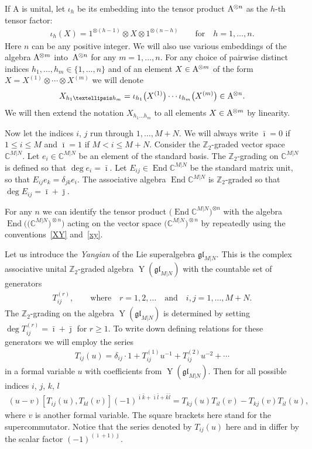 \documentclass[11pt]{article}
\numberwithin{equation}{section}
\def\bi{{\bar\imath }}
\def\bj{{\bar\jmath }}
\def\bk{{\bar k }}
\def\bl{{\bar l }}
\def\CC{{\mathbb{C}}}
\def\CMN{\CC^{M|N}}
\def\de{\delta}
\def\End{\operatorname{End}}
\def\ge{\geqslant}
\def\glMN{\mathfrak{gl}_{M|N}}
\def\le{\leqslant}
\def\ns{{\hskip-.5pt}}
\def\ot{\otimes}
\def\YMN{\operatorname{Y}(\glMN)}
\def\ZZ{\mathbb{Z}}
\begin{document}
If $\mathrm{A}$ is unital,
let $\iota_{h}$ be
its embedding into the tensor product $\mathrm{A}^{\ns\ot n}$
as the $h $-th tensor factor:
\begin{gather*}
\iota_{h}(X)=1^{\ot (h-1)}\ot X\ot1^{\ot (n-h)}\qquad\text{for}\quad h=1,\dots, n .
\end{gather*}
Here $n$ can be any positive integer.
We will also use various embeddings of the algebra
$\mathrm{A}^{\ns\ot m}$ into~$\mathrm{A}^{\ns\ot n}$
for any $m=1,\dots, n$.
For any choice of pairwise distinct indices $h_1,\dots, h_m\in\{1,\dots, n \}$
and of an element $X\in\mathrm{A}^{\ns\ot m}$ of the form
$X=X^{(1)}\ot\cdots\ot X^{(m)}$ we will denote
\begin{gather*}
X_{h_1\dots h_m}=\iota_{h_1}\big(X^{(1)}\big) \cdots \iota_{h_m}\big(X^{(m)}\big) \in\mathrm{A}^{\ns\ot n}.
\end{gather*}
We will then extend the notation $X_{h_1\dots h_m}$ to all elements
$X\in\mathrm{A}^{\ns\ot m}$ by linearity.

Now let the indices $i$, $j$ run through $1,\dots, M+N $.
We will always write $\bi=0$ if $1\le i\le M$ and
$\bi=1$ if $M<i\le M+N $. Consider the
$\ZZ_{2}$-graded vector space $\CMN $.
Let $e_i\in\CMN$ be an element of the standard basis.
The $\ZZ_{2}$-grading on $\CMN$ is defined so that $\deg e_i=\bi $.
Let $E_{ij}\in\End\CMN$ be the standard matrix unit, so that
$E_{ij} e_k=\de_{jk} e_i $. The
associative algebra $\End\CMN$
is $\ZZ_{2}$-graded so that $\deg E_{ij}=\bi+ \bj $.

For any $n$ we can identify
the tensor product $\big(\!\End\CMN\big)^{\ot n}$ with the algebra
$\End\!\big(\big(\CMN\big)^{\!\ot n}\big)$ acting on the vector space $\big(\CMN\big)^{\!\ot n}$
by repeatedly using the conventions~\eqref{XY} and~\eqref{xy}.

Let us introduce the {\it Yangian} of the Lie superalgebra
$\glMN$. This is the complex associative
unital $\ZZ_{2}$-graded algebra $\YMN$ with the countable set of generators
\begin{gather}\label{Tijr}
T^{(r)}_{ij},
\qquad\text{where}\quad r=1,2, \dots \quad\text{and}\quad i ,j=1,\dots, M+N .
\end{gather}
The $\ZZ_{2}$-grading on the algebra $\YMN$
is determined by setting $\deg T_{ij}^{(r)}=\bi+\bj$ for $r\ge1$.
To write down defining relations for these
generators we will employ the series
\begin{gather}\label{3.0}
T_{ij}(u)=\de_{ij}\cdot1+T_{ij}^{(1)} u^{-1}+T_{ij}^{(2)} u^{-2}+\cdots
\end{gather}
in a formal variable $u$ with coefficients from $\YMN $.
Then for all possible indices $i$, $j$, $k$, $l${\samepage
\begin{gather}\label{3.1}
(u-v)[ T_{ij}(u) ,T_{kl}(v) ](-1)^{\bi \bk + \bi \bl + \bk \bl}=T_{kj}(u) T_{il}(v)-T_{kj}(v) T_{il}(u),
\end{gather}
where $v$ is another formal variable.
The square brackets here stand for the supercommutator.
Notice that the series denoted by $T_{ij}(u)$
here and in \cite{N1} differ by the scalar factor
$(-1)^{( \bi+1 ) \bj}$.}
\end{document}
